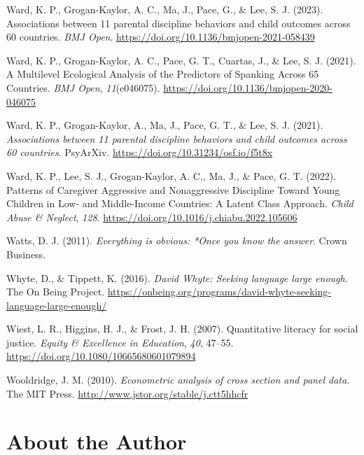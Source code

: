 \documentclass[
  letterpaper,
  DIV=11,
  numbers=noendperiod]{scrreprt}
\newlength{\cslhangindent}
\newenvironment{CSLReferences}[2] %
 {\begin{list}{}{%
  \setlength{\itemindent}{0pt}
  \setlength{\leftmargin}{0pt}
  \setlength{\parsep}{0pt}
  \ifodd #1
   \setlength{\leftmargin}{\cslhangindent}
   \setlength{\itemindent}{-1\cslhangindent}
  \fi
  \setlength{\itemsep}{#2\baselineskip}}}
 {\end{list}}
\begin{document}
\begin{CSLReferences}{1}{0}
Ward, K. P., Grogan-Kaylor, A. C., Ma, J., Pace, G., \& Lee, S. J.
(2023). Associations between 11 parental discipline behaviors and child
outcomes across 60 countries. \emph{BMJ Open}.
\url{https://doi.org/10.1136/bmjopen-2021-058439}

Ward, K. P., Grogan-Kaylor, A. C., Pace, G. T., Cuartas, J., \& Lee, S.
J. (2021). {A Multilevel Ecological Analysis of the Predictors of
Spanking Across 65 Countries}. \emph{BMJ Open}, \emph{11}(e046075).
\url{https://doi.org/10.1136/bmjopen-2020-046075}

Ward, K. P., Grogan-Kaylor, A., Ma, J., Pace, G. T., \& Lee, S. J.
(2021). \emph{Associations between 11 parental discipline behaviors and
child outcomes across 60 countries}. PsyArXiv.
\url{https://doi.org/10.31234/osf.io/f5t8x}

Ward, K. P., Lee, S. J., Grogan-Kaylor, A. C., Ma, J., \& Pace, G. T.
(2022). {Patterns of Caregiver Aggressive and Nonaggressive Discipline
Toward Young Children in Low- and Middle-Income Countries: A Latent
Class Approach}. \emph{Child Abuse \& Neglect}, \emph{128}.
\url{https://doi.org/10.1016/j.chiabu.2022.105606}

Watts, D. J. (2011). \emph{Everything is obvious: *Once you know the
answer}. Crown Business.

Whyte, D., \& Tippett, K. (2016). \emph{{D}avid {W}hyte: Seeking
language large enough}. The On Being Project.
\url{https://onbeing.org/programs/david-whyte-seeking-language-large-enough/}

Wiest, L. R., Higgins, H. J., \& Frost, J. H. (2007). Quantitative
literacy for social justice. \emph{Equity \& Excellence in Education},
\emph{40}, 47--55. \url{https://doi.org/10.1080/10665680601079894}

Wooldridge, J. M. (2010). \emph{Econometric analysis of cross section
and panel data}. The MIT Press.
\url{http://www.jstor.org/stable/j.ctt5hhcfr}

\end{CSLReferences}


\chapter{About the Author}\label{about-the-author}
\end{document}
